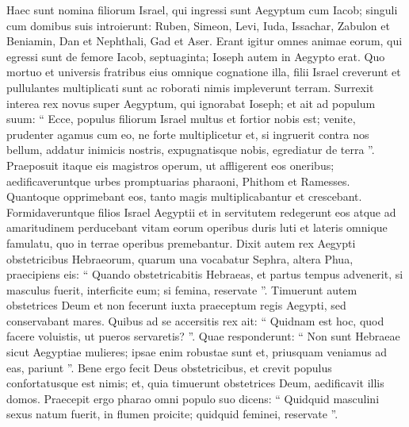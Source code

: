 \begin{biblechapter}
 \verse Haec sunt nomina filiorum Israel, qui ingressi sunt Aegyptum cum Iacob; singuli cum domibus suis introierunt: 
\verse Ruben, Simeon, Levi, Iuda, 
\verse Issachar, Zabulon et Beniamin, 
\verse Dan et Nephthali, Gad et Aser. 
\verse Erant igitur omnes animae eorum, qui egressi sunt de femore Iacob, septuaginta; Ioseph autem in Aegypto erat. 
\verse Quo mortuo et universis fratribus eius omnique cognatione illa, 
\verse filii Israel creverunt et pullulantes multiplicati sunt ac roborati nimis impleverunt terram.
 \verse Surrexit interea rex novus super Aegyptum, qui ignorabat Ioseph; 
\verse et ait ad populum suum: “ Ecce, populus filiorum Israel multus et fortior nobis est; 
 \verse venite, prudenter agamus cum eo, ne forte multiplicetur et, si ingruerit contra nos bellum, addatur inimicis nostris, expugnatisque nobis, egrediatur de terra ”. 
\verse Praeposuit itaque eis magistros operum, ut affligerent eos oneribus; aedificaveruntque urbes promptuarias pharaoni, Phithom et Ramesses. 
 \verse Quantoque opprimebant eos, tanto magis multiplicabantur et crescebant. 
\verse Formidaveruntque filios Israel Aegyptii et in servitutem redegerunt eos 
\verse atque ad amaritudinem perducebant vitam eorum operibus duris luti et lateris omnique famulatu, quo in terrae operibus premebantur.
 \verse Dixit autem rex Aegypti obstetricibus Hebraeorum, quarum una vocabatur Sephra, altera Phua, 
\verse praecipiens eis: “ Quando obstetricabitis Hebraeas, et partus tempus advenerit, si masculus fuerit, interficite eum; si femina, reservate ”. 
\verse Timuerunt autem obstetrices Deum et non fecerunt iuxta praeceptum regis Aegypti, sed conservabant mares. 
\verse Quibus ad se accersitis rex ait: “ Quidnam est hoc, quod facere voluistis, ut pueros servaretis? ”.
 \verse Quae responderunt: “ Non sunt Hebraeae sicut Aegyptiae mulieres; ipsae enim robustae sunt et, priusquam veniamus ad eas, pariunt ”. 
\verse Bene ergo fecit Deus obstetricibus, et crevit populus confortatusque est nimis; 
\verse et, quia timuerunt obstetrices Deum, aedificavit illis domos.
 \verse Praecepit ergo pharao omni populo suo dicens: “ Quidquid masculini sexus natum fuerit, in flumen proicite; quidquid feminei, reservate ”.
 

\end{biblechapter}
